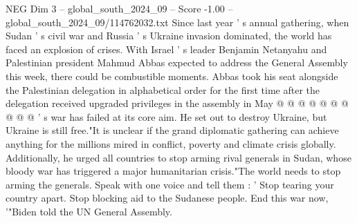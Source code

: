 \begin{textsample}{NEG Dim 3 – global\_south\_2024\_09 – Score -1.00 – global\_south\_2024\_09/114762032.txt}
Since last year ' s annual gathering, when Sudan ' s civil war and Russia ' s Ukraine invasion dominated, the world has faced an explosion of crises.
With Israel ' s leader Benjamin Netanyahu and Palestinian president Mahmud Abbas expected to address the General Assembly this week, there could be combustible moments.
Abbas took his seat alongside the Palestinian delegation in alphabetical order for the first time after the delegation received upgraded privileges in the assembly in May @ @ @ @ @ @ @ @ @ @ ' s war has failed at its core aim.
He set out to destroy Ukraine, but Ukraine is still free."It is unclear if the grand diplomatic gathering can achieve anything for the millions mired in conflict, poverty and climate crisis globally.
Additionally, he urged all countries to stop arming rival generals in Sudan, whose bloody war has triggered a major humanitarian crisis."The world needs to stop arming the generals.
Speak with one voice and tell them : ' Stop tearing your country apart.
Stop blocking aid to the Sudanese people.
End this war now, '"Biden told the UN General Assembly.

\end{textsample}
